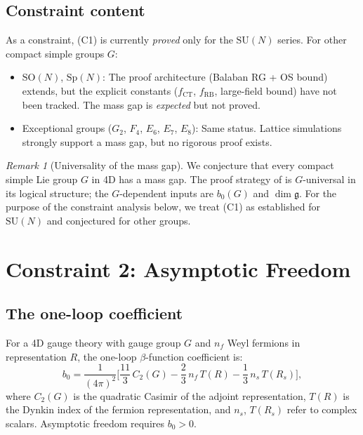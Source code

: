 \documentclass[12pt]{article}
\theoremstyle{definition}
\theoremstyle{remark}
\newtheorem{remark}[theorem]{Remark}
\newcommand{\SU}{\mathrm{SU}}
\newcommand{\SO}{\mathrm{SO}}
\newcommand{\Sp}{\mathrm{Sp}}
\begin{document}
\subsection{Constraint content}

As a constraint, (C1) is currently \emph{proved} only for the
$\SU(N)$ series.  For other compact simple groups $G$:

\begin{itemize}
\item $\SO(N)$, $\Sp(N)$: The proof architecture
  (Balaban RG + OS bound) extends, but the explicit constants
  ($f_{\mathrm{CT}}$, $f_{\mathrm{RB}}$, large-field bound)
  have not been tracked.  The mass gap is \emph{expected} but
  not proved.

\item Exceptional groups ($G_2$, $F_4$, $E_6$, $E_7$, $E_8$):
  Same status.  Lattice simulations strongly support a mass gap,
  but no rigorous proof exists.
\end{itemize}

\begin{remark}[Universality of the mass gap]
\label{rem:mass_gap_universal}
We conjecture that every compact simple Lie group $G$ in 4D
has a mass gap.  The proof strategy of \cite{Olbryk2026MG}
is $G$-universal in its logical structure; the $G$-dependent
inputs are $b_0(G)$ and $\dim\mathfrak{g}$.  For the purpose of
the constraint analysis below, we treat (C1) as established for
$\SU(N)$ and conjectured for other groups.
\end{remark}

\section{Constraint 2: Asymptotic Freedom}
\label{sec:AF}

\subsection{The one-loop coefficient}

For a 4D gauge theory with gauge group $G$ and $n_f$ Weyl fermions
in representation $R$, the one-loop $\beta$-function coefficient is:
\begin{equation}\label{eq:b0}
  b_0 = \frac{1}{(4\pi)^2}
  \biggl[\frac{11}{3}\,C_2(G) - \frac{2}{3}\,n_f\,T(R)
  - \frac{1}{3}\,n_s\,T(R_s)\biggr],
\end{equation}
where $C_2(G)$ is the quadratic Casimir of the adjoint
representation, $T(R)$ is the Dynkin index of the fermion
representation, and $n_s$, $T(R_s)$ refer to complex scalars.
Asymptotic freedom requires $b_0 > 0$.
\end{document}

